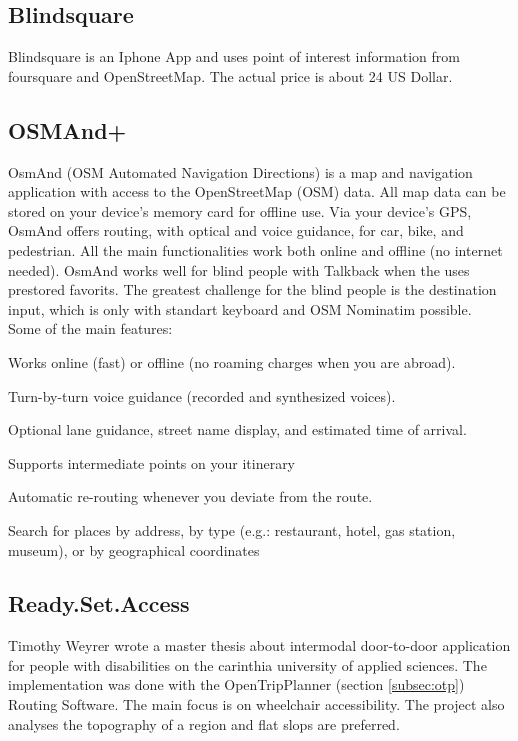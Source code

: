 \documentclass{sig-alternate}
\begin{document}
\subsection{Blindsquare}
Blindsquare\cite{blindsquare} is an Iphone App and uses point of interest information from foursquare and OpenStreetMap. The actual price is about 24 US Dollar. 

\subsection{OSMAnd+}
OsmAnd (OSM Automated Navigation Directions) is a map and navigation application with access to the OpenStreetMap (OSM) data. All map data can be stored on your device's memory card for offline use. Via your device's GPS, OsmAnd offers routing, with optical and voice guidance, for car, bike, and pedestrian. All the main functionalities work both online and offline (no internet needed).
OsmAnd works well for blind people with Talkback when the uses prestored favorits. The greatest challenge for the blind people is the destination input, which is only with standart keyboard and OSM Nominatim possible. \\
Some of the main features: 
\begin{description}
  \item Works online (fast) or offline (no roaming charges when you are abroad). 
  \item Turn-by-turn voice guidance (recorded and synthesized voices). 
  \item Optional lane guidance, street name display, and estimated time of arrival. 
  \item Supports intermediate points on your itinerary
  \item Automatic re-routing whenever you deviate from the route.
  \item Search for places by address, by type (e.g.: restaurant, hotel, gas station, museum), or by geographical coordinates
\end{description}


\subsection{Ready.Set.Access} 
Timothy Weyrer\cite{weyrer} wrote a master thesis about intermodal door-to-door application for people with disabilities on the carinthia university of applied sciences. The implementation was done with the OpenTripPlanner (section \ref{subsec:otp}) Routing Software. The main focus is on wheelchair accessibility. The project also analyses the topography of a region and flat slops are preferred. 
\end{document}
